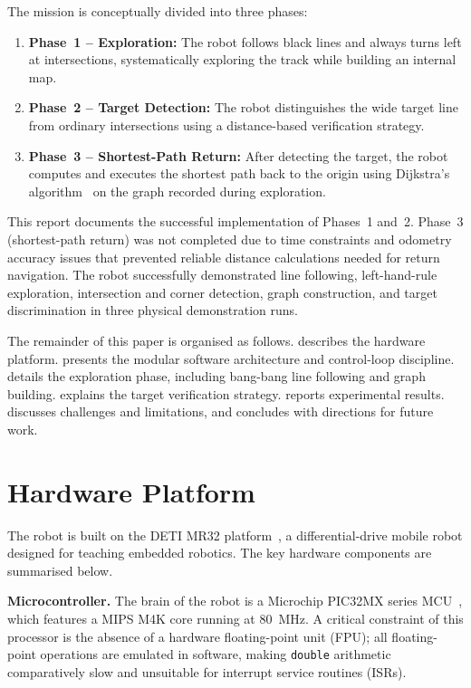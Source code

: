 \documentclass[runningheads]{llncs}
\begin{document}
The mission is conceptually divided into three phases:
\begin{enumerate}
    \item \textbf{Phase~1 -- Exploration:} The robot follows black lines and always turns left at intersections, systematically exploring the track while building an internal map.
    \item \textbf{Phase~2 -- Target Detection:} The robot distinguishes the wide target line from ordinary intersections using a distance-based verification strategy.
    \item \textbf{Phase~3 -- Shortest-Path Return:} After detecting the target, the robot computes and executes the shortest path back to the origin using Dijkstra's algorithm~\cite{dijkstra1959} on the graph recorded during exploration.
\end{enumerate}

This report documents the successful implementation of Phases~1 and~2. Phase~3 (shortest-path return) was not completed due to time constraints and odometry accuracy issues that prevented reliable distance calculations needed for return navigation. The robot successfully demonstrated line following, left-hand-rule exploration, intersection and corner detection, graph construction, and target discrimination in three physical demonstration runs.

The remainder of this paper is organised as follows.  describes the hardware platform.  presents the modular software architecture and control-loop discipline.  details the exploration phase, including bang-bang line following and graph building.  explains the target verification strategy.  reports experimental results.  discusses challenges and limitations, and  concludes with directions for future work.

\section{Hardware Platform}\label{sec:hardware}

The robot is built on the DETI MR32 platform~\cite{detimr32}, a differential-drive mobile robot designed for teaching embedded robotics. The key hardware components are summarised below.

\textbf{Microcontroller.} The brain of the robot is a Microchip PIC32MX series MCU~\cite{pic32mxref}, which features a MIPS M4K core running at 80~MHz. A critical constraint of this processor is the absence of a hardware floating-point unit (FPU); all floating-point operations are emulated in software, making \texttt{double} arithmetic comparatively slow and unsuitable for interrupt service routines (ISRs).
\end{document}
